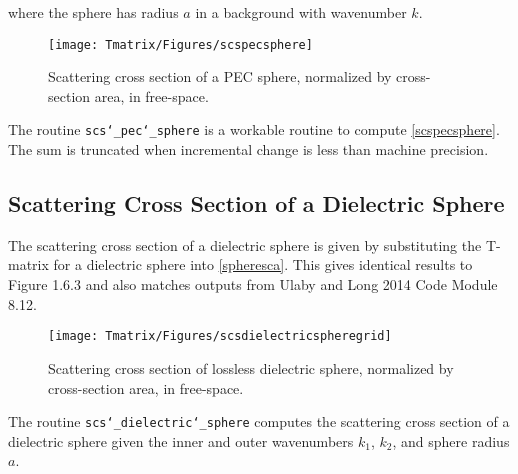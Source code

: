\noindent where the sphere has radius $a$ in a background with wavenumber $k$.

\begin{figure}[H] 
   \centering
   \texttt{[image: Tmatrix/Figures/scspecsphere]} 
   \caption{Scattering cross section of a PEC sphere, normalized by cross-section area, in free-space.}
   \label{scspecsph}
\end{figure}




The routine \texttt{scs\char`_pec\char`_sphere} is a workable routine to compute \eqref{scspecsphere}. The sum is truncated when incremental change is less than machine precision. 

{\footnotesize
{}
}

\subsection{Scattering Cross Section of a Dielectric Sphere}

The scattering cross section of a dielectric sphere is given by substituting the T-matrix for a dielectric sphere into \eqref{spheresca}. This gives identical results to \cite{tsang2000scattering} Figure 1.6.3 and also matches outputs from Ulaby and Long 2014 Code Module 8.12.


\begin{figure}[H] 
   \centering
   \texttt{[image: Tmatrix/Figures/scsdielectricspheregrid]} 
   \caption{Scattering cross section of lossless dielectric sphere, normalized by cross-section area, in free-space.}
      \label{scsdiesphall}
\end{figure}

\clearpage


The routine \texttt{scs\char`_dielectric\char`_sphere} computes the scattering cross section of a dielectric sphere given the inner and outer wavenumbers $k_1$, $k_2$, and sphere radius $a$.  

{\footnotesize
{}
}

